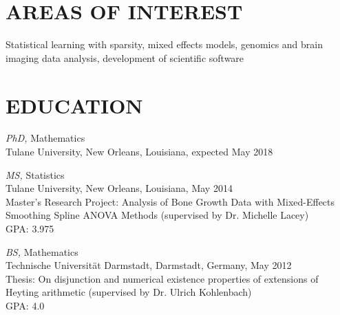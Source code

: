 \documentclass[margin]{res} %
\begin{document}
\begin{resume}
%
%
%
%

\section{AREAS OF INTEREST}

Statistical learning with sparsity, mixed effects models, genomics and brain imaging data analysis, development of scientific software


\section{EDUCATION}

{\sl PhD,} Mathematics \\
Tulane University, New Orleans, Louisiana, expected May 2018

{\sl MS,} Statistics \\
Tulane University, New Orleans, Louisiana, May 2014\\
Master's Research Project: Analysis of Bone Growth Data with Mixed-Effects Smoothing Spline ANOVA Methods (supervised by Dr. Michelle Lacey)\\
GPA: 3.975

{\sl BS,} Mathematics\\
Technische Universit\"{a}t Darmstadt, Darmstadt, Germany, May 2012\\
Thesis: On disjunction and numerical existence properties of extensions of Heyting arithmetic (supervised by Dr. Ulrich Kohlenbach)\\
GPA: 4.0
 

\end{resume}
\end{document}
